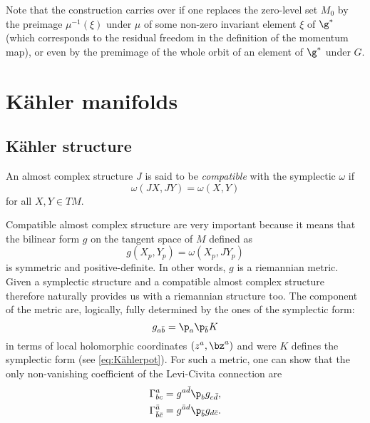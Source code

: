 \documentclass{worksheetclass}
\begin{document}
        Note that the construction carries over if one replaces the zero-level set $M_0$ by the preimage $\mu^{-1}(\xi)$ under $\mu$ of some non-zero invariant element $\xi$ of $\g^*$ (which corresponds to the residual freedom in the definition of the momentum map), or even by the premimage of the whole orbit of an element of $\g^*$ under $G$.

\section{Kähler manifolds}

    \subsection{Kähler structure}

        \begin{defn}
            An almost complex structure $J$ is said to be \emph{compatible} with the symplectic $\omega$ if 
            \begin{equation*}
                \omega(JX,JY) = \omega(X,Y)
            \end{equation*}
            for all $X,Y\in TM$.
        \end{defn}
        Compatible almost complex structure are very important because it means that the bilinear form $g$ on the tangent space of $M$ defined as
        \begin{equation}
            g(X_p,Y_p)=\omega(X_p,JY_p)
        \end{equation}
        is symmetric and positive-definite. In other words, $g$ is a riemannian metric. Given a symplectic structure and a compatible almost complex structure therefore naturally provides us with a riemannian structure too. The component of the metric are, logically, fully determined by the ones of the symplectic form:
        \begin{equation}
            g_{a\bar{b}}=\p_a\p_{\bar{b}}K
        \end{equation}
        in terms of local holomorphic coordinates $(z^a,\bz^a)$ and were $K$ defines the symplectic form (see \eqref{eq:Kählerpot}). For such a metric, one can show that the only non-vanishing coefficient of the Levi-Civita connection are
        \begin{align}
            \Gamma^a_{bc} &= g^{a\bar{d}}\p_bg_{c\bar{d}},\\
            \Gamma^{\bar{a}}_{\bar{b}\bar{c}} &= g^{\bar{a}d}\p_{\bar{b}}g_{d\bar{c}}.
        \end{align}
        
\end{document}
